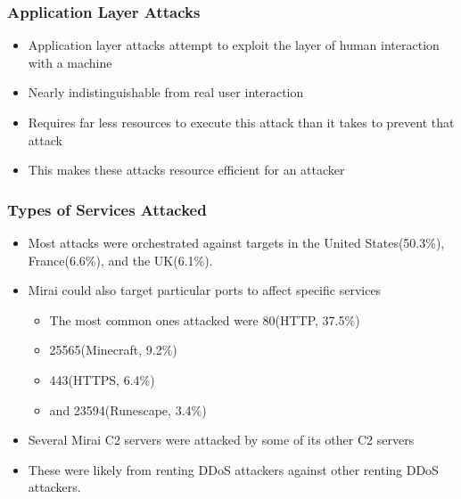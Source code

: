 \documentclass{beamer}
\begin{document}
\begin{frame}
    \frametitle{Application Layer Attacks}
        \begin{itemize}
            \item<+-> Application layer attacks attempt to exploit the layer of human interaction with a machine
            \item<+-> Nearly indistinguishable from real user interaction
            \item<+-> Requires far less resources to execute this attack than it takes to prevent that attack
            \item<+-> This makes these attacks resource efficient for an attacker
    \end{itemize}
\end{frame}

\begin{frame}
    \frametitle{Types of Services Attacked}
    \begin{itemize}
        \item<+-> Most attacks were orchestrated against targets in the United States(50.3\%), France(6.6\%), and the UK(6.1\%).
        \item<+-> Mirai could also target particular ports to affect specific services
        \begin{itemize}
        		\item<+-> The most common ones attacked were 80(HTTP, 37.5\%)
        		\item<+-> 25565(Minecraft, 9.2\%)
        		\item<+-> 443(HTTPS, 6.4\%)
        		\item<+-> and 23594(Runescape, 3.4\%)
        \end{itemize}
        \item<+-> Several Mirai C2 servers were attacked by some of its other C2 servers
        \item<+-> These were likely from renting DDoS attackers against other renting DDoS attackers.
    \end{itemize}
\end{frame}
\end{document}
